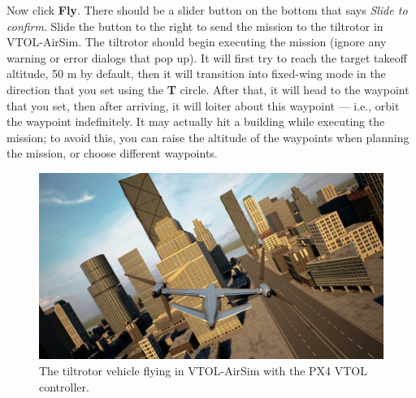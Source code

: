 Now click \textbf{Fly}. There should be a slider button on the bottom that says \textit{Slide to confirm}. Slide the button to the right to send the mission to the tiltrotor in VTOL-AirSim. The tiltrotor should begin executing the mission (ignore any warning or error dialogs that pop up). It will first try to reach the target takeoff altitude, 50 m by default, then it will transition into fixed-wing mode in the direction that you set using the \textbf{T} circle. After that, it will head to the waypoint that you set, then after arriving, it will loiter about this waypoint --- i.e., orbit the waypoint indefinitely. It may actually hit a building while executing the mission; to avoid this, you can raise the altitude of the waypoints when planning the mission, or choose different waypoints.

\begin{figure}[h]
    \centering
    \includegraphics[width=\textwidth]{figures/vtol_example_px4}
    \caption[Tiltrotor flying with PX4 Autopilot]{
        The tiltrotor vehicle flying in VTOL-AirSim with the PX4 VTOL controller.}%
    \label{fig:vtol_example_px4}
\end{figure}